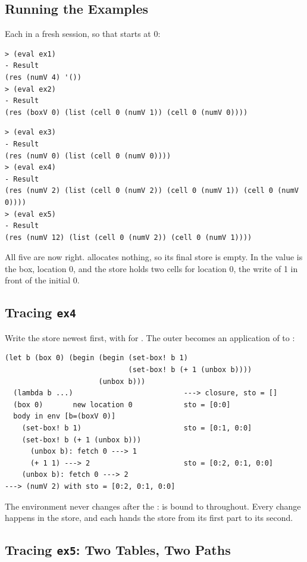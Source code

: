 \subsection{Running the Examples}

Each in a fresh session, so that  starts at 0:
\begin{lstlisting}[style=repl]
> (eval ex1)
- Result
(res (numV 4) '())
> (eval ex2)
- Result
(res (boxV 0) (list (cell 0 (numV 1)) (cell 0 (numV 0))))
\end{lstlisting}
\begin{lstlisting}[style=repl]
> (eval ex3)
- Result
(res (numV 0) (list (cell 0 (numV 0))))
> (eval ex4)
- Result
(res (numV 2) (list (cell 0 (numV 2)) (cell 0 (numV 1)) (cell 0 (numV 0))))
> (eval ex5)
- Result
(res (numV 12) (list (cell 0 (numV 2)) (cell 0 (numV 1))))
\end{lstlisting}
All five are now right.  allocates nothing, so its final store is empty. In  the value is the box, location 0, and the store holds two cells for location 0, the write of 1 in front of the initial 0.

\subsection{Tracing \texttt{ex4}}

Write the store newest first, with  for . The outer  becomes an application of  to :
\begin{lstlisting}[style=repl]
(let b (box 0) (begin (begin (set-box! b 1)
                             (set-box! b (+ 1 (unbox b))))
                      (unbox b)))
  (lambda b ...)                          ---> closure, sto = []
  (box 0)       new location 0            sto = [0:0]
  body in env [b=(boxV 0)]
    (set-box! b 1)                        sto = [0:1, 0:0]
    (set-box! b (+ 1 (unbox b)))
      (unbox b): fetch 0 ---> 1
      (+ 1 1) ---> 2                      sto = [0:2, 0:1, 0:0]
    (unbox b): fetch 0 ---> 2
---> (numV 2) with sto = [0:2, 0:1, 0:0]
\end{lstlisting}
The environment never changes after the :  is bound to  throughout. Every change happens in the store, and each  hands the store from its first part to its second.

\subsection{Tracing \texttt{ex5}: Two Tables, Two Paths}


